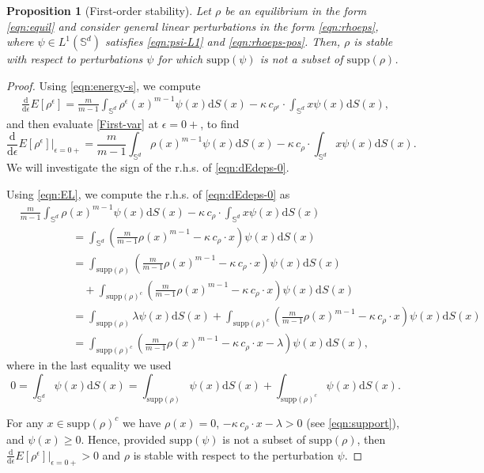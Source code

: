 \documentclass[11pt]{amsart}
\newtheorem{proposition}{Proposition}[section]
\newcommand{\bbs}{\mathbb S}
\def\d{\mathrm{d}}
\newcommand{\dx}{\mathrm{d}S (x)}
\newcommand{\supp}{\mathrm{supp}(\rho)}
\newcommand{\dm}{d} %
\begin{document}
\begin{proposition}[First-order stability]
\label{prop:fo-stab}
Let $\rho$ be an equilibrium in the form \eqref{eqn:equil} and consider general linear perturbations in the form \eqref{eqn:rhoeps}, where $\psi \in L^1(\bbs^\dm)$ satisfies \eqref{eqn:psi-L1} and \eqref{eqn:rhoeps-pos}. Then, $\rho$ is stable with respect to perturbations $\psi$ for which $\mathrm{supp}(\psi)$ is not a subset of $\supp$.
\end{proposition}
\begin{proof}
Using \eqref{eqn:energy-s}, we compute
\begin{align}\label{First-var}
\frac{\d}{\d\epsilon}E[\rho^\epsilon]=\frac{m}{m-1}\int_{\bbs^\dm}\rho^\epsilon(x)^{m-1}\psi(x)\dx-\kappa \, c_{\rho^\epsilon} \cdot \int_{\bbs^\dm} x \psi(x) \dx,
\end{align}
and then evaluate \eqref{First-var} at $\epsilon = 0+$, to find
\begin{equation}
\label{eqn:dEdeps-0}
\frac{\d}{\d\epsilon}E[\rho^\epsilon]\bigg|_{\epsilon=0+}=\frac{m}{m-1}\int_{\bbs^\dm}\rho(x)^{m-1}\psi(x)\dx-\kappa \, c_{\rho} \cdot \int_{\bbs^\dm} x \psi(x) \dx.
\end{equation}
We will investigate the sign of the r.h.s. of \eqref{eqn:dEdeps-0}. 

Using \eqref{eqn:EL}, we compute the r.h.s. of \eqref{eqn:dEdeps-0} as
\begin{align*}
&\frac{m}{m-1}\int_{\bbs^\dm}\rho(x)^{m-1}\psi(x)\dx-\kappa \, c_{\rho} \cdot \int_{\bbs^\dm} x \psi(x) \dx \\[2pt]
& \hspace{2cm} =\int_{\bbs^\dm}\left(\frac{m}{m-1}\rho(x)^{m-1}-\kappa \, c_\rho\cdot x\right)\psi(x)\dx\\[2pt]
&\hspace{2cm} =\int_{\supp}\left(\frac{m}{m-1}\rho(x)^{m-1}-\kappa \, c_\rho\cdot x\right)\psi(x)\dx \\
&\hspace{2cm} \quad +\int_{\supp^c}\left(\frac{m}{m-1}\rho(x)^{m-1}-\kappa \, c_\rho\cdot x\right)\psi(x)\dx\\
&\hspace{2cm} =\int_{\supp}\lambda \psi(x)\dx+\int_{\supp^c}\left(\frac{m}{m-1}\rho(x)^{m-1}-\kappa \, c_\rho\cdot x\right)\psi(x)\dx\\
&\hspace{2cm} =\int_{\supp^c}\left(\frac{m}{m-1}\rho(x)^{m-1}-\kappa \, c_\rho\cdot x-\lambda\right)\psi(x)\dx,
\end{align*}
where in the last equality we used
\[
0=\int_{\bbs^\dm}\psi(x)\dx=\int_{\supp}\psi(x)\dx+\int_{\supp^c}\psi(x)\dx.
\]

For any $ x \in \supp^c$ we have $\rho(x)=0$, $-\kappa \, c_\rho\cdot x -\lambda>0$ (see \eqref{eqn:support}), and $\psi(x) \geq 0$. Hence, provided $\mathrm{supp}(\psi)$ is not a subset of $\supp$, then $\frac{\d}{\d\epsilon}E[\rho^\epsilon]\big|_{\epsilon=0+}>0$ and $\rho$ is stable with respect to the perturbation $\psi$. 
\end{proof}
\end{document}
